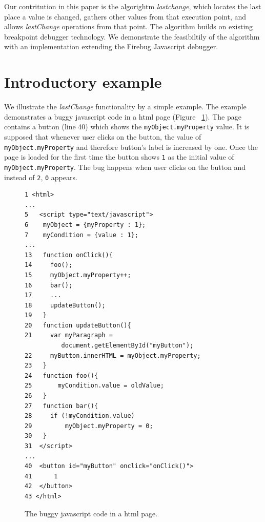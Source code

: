 \documentclass[preprint]{sigplanconf}
\begin{document}
Our contritution in this paper is the algorightm \textit{lastchange}, which locates the last place a value is changed, gathers other values from that execution point, and allows \textit{lastChange} operations from that point. The algorithm builds on existing breakpoint debugger technology. We demonstrate the feasibiltily of the algorithm with an implementation extending the Firebug Javascript debugger.



\section{Introductory example}
We illustrate the \textit{lastChange} functionality by a simple example. The example demonstrates a buggy javascript code in a html page (Figure ~\ref{fig:js-code}). The page contains a button (line 40) which shows the \texttt{myObject.myProperty} value. It is supposed that whenever user clicks on the button, the value of \texttt{myObject.myProperty} and therefore button's label is increased by one. Once the page is loaded for the first time the button shows \texttt{1} as the initial value of \texttt{myObject.myProperty}. The bug happens when user clicks on the button and instead of \texttt{2}, \texttt{0} appears. 


\begin{figure}[htp]
\begin{verbatim}
1 <html>
...
5   <script type="text/javascript">
6    myObject = {myProperty : 1};
7    myCondition = {value : 1};
...
13   function onClick(){
14     foo();
15     myObject.myProperty++;
16     bar();
17     ...
18     updateButton();
19   }
20   function updateButton(){
21     var myParagraph =
          document.getElementById("myButton");
22     myButton.innerHTML = myObject.myProperty;
23   }   
24   function foo(){
25  	 myCondition.value = oldValue;
26   }  
27   function bar(){ 
28     if (!myCondition.value)
29         myObject.myProperty = 0;
30   }
31  </script> 
...
40  <button id="myButton" onclick="onClick()">
41  	1 
42  </button>
43 </html>
\end{verbatim}
\caption{The buggy javascript code in a html page.}
\label{fig:js-code}
\end{figure}
\end{document}
